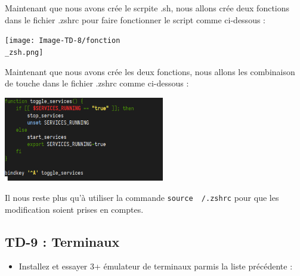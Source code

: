 \documentclass[12pt]{article}
\begin{document}
\vspace{0.3cm}

Maintenant que nous avons crée le scrpite .sh, nous allons crée deux fonctions dans le fichier .zshrc pour faire fonctionner le script comme ci-dessous : 

\vspace{0.3cm}

\begin{center}
  \texttt{[image: Image-TD-8/fonction\\\_zsh.png]}
\end{center}

\vspace{0.3cm}

Maintenant que nous avons crée les deux fonctions, nous allons les combinaison de touche dans le fichier .zshrc comme ci-dessous : 

\vspace{0.3cm}

\begin{center}
  \includegraphics[width=7cm]{Image-TD-8/bindkey.png}
\end{center}

\vspace{0.3cm}

Il nous reste plus qu'à utiliser la commande \texttt{source ~/.zshrc} pour que les modification soient prises en comptes.

\newpage

  \subsection{TD-9 : Terminaux}

\vspace{0.3cm}

\begin{itemize}
  \item Installez et essayer 3+ émulateur de terminaux parmis la liste précédente : 
\end{itemize}

\vspace{0.3cm}
\end{document}
